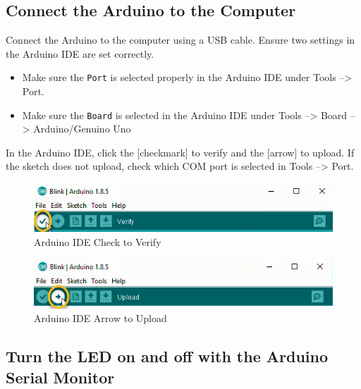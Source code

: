 \documentclass{book}
\makeatletter
\def\maxwidth{\ifdim\Gin@nat@width>\linewidth\linewidth
    \else\Gin@nat@width\fi}
\let\Oldincludegraphics\includegraphics
\renewcommand{\includegraphics}[1]{\Oldincludegraphics[width=.8\maxwidth]{#1}}
\providecommand{\tightlist}{%
      \setlength{\itemsep}{0pt}\setlength{\parskip}{0pt}}
\makeatother
\begin{document}
    
        \subsection{Connect the Arduino to the
Computer}\label{connect-the-arduino-to-the-computer}
    




    
        Connect the Arduino to the computer using a USB cable. Ensure two
settings in the Arduino IDE are set correctly.

\begin{itemize}
\tightlist
\item
  Make sure the \lstinline!Port! is selected properly in the Arduino IDE
  under Tools --\textgreater{} Port.
\item
  Make sure the \lstinline!Board! is selected in the Arduino IDE under
  Tools --\textgreater{} Board --\textgreater{} Arduino/Genuino Uno
\end{itemize}

In the Arduino IDE, click the {[}checkmark{]} to verify and the
{[}arrow{]} to upload. If the sketch does not upload, check which COM
port is selected in Tools --\textgreater{} Port.

\begin{figure}
\centering
\includegraphics{images/Check_to_Verify.png}
\caption{Arduino IDE Check to Verify}
\end{figure}

\begin{figure}
\centering
\includegraphics{images/Arrow_to_Upload.png}
\caption{Arduino IDE Arrow to Upload}
\end{figure}
    




    
        \subsection{Turn the LED on and off with the Arduino Serial
Monitor}\label{turn-the-led-on-and-off-with-the-arduino-serial-monitor}
    
\end{document}
